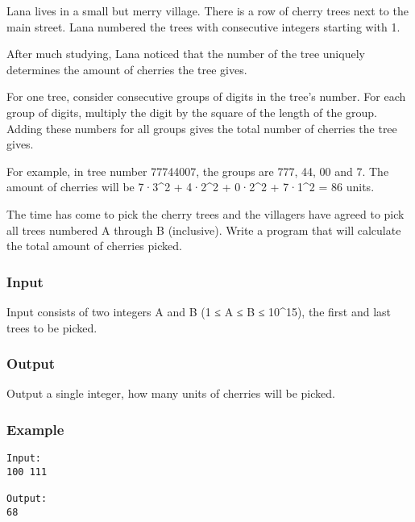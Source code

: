 



   Lana lives in a small but merry village. There is a row of cherry trees next to the main street. Lana numbered the trees with consecutive integers starting with 1.  

   After much studying, Lana noticed that the number of the tree uniquely determines the amount of cherries the tree gives.  

   For one tree, consider consecutive groups of digits in the tree's number. For each group of digits, multiply the digit by the square of the length of the group. Adding these numbers for all groups gives the total number of cherries the tree gives.  

   For example, in tree number 77744007, the groups are 777, 44, 00 and 7. The amount of cherries will be 7·3\textasciicircum2 + 4·2\textasciicircum2 + 0·2\textasciicircum2 + 7·1\textasciicircum2 = 86 units.  

   The time has come to pick the cherry trees and the villagers have agreed to pick all trees numbered A through B (inclusive). Write a program that will calculate the total amount of cherries picked.  

\subsubsection{   Input  }

   Input consists of two integers A and B (1 ≤ A ≤ B ≤ 10\textasciicircum15), the first and last trees to be picked.  

\subsubsection{   Output  }

   Output a single integer, how many units of cherries will be picked.  

\subsubsection{   Example  }
\begin{verbatim}
Input:
100 111

Output:
68
\end{verbatim}
